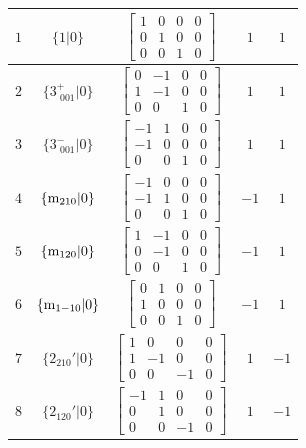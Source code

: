 \documentclass[fleqn,8pt]{jsarticle}
\begin{document}
\begin{longtable}{ccccc}
$ 1 $ & $ \{1|0\} $ & $ \begin{bmatrix} 1 & 0 & 0 & 0 \\ 0 & 1 & 0 & 0 \\ 0 & 0 & 1 & 0 \end{bmatrix} $ & $ 1 $ & $ 1 $ \\ \hline
$ 2 $ & $ \{3^{+}_{\,\,001}|0\} $ & $ \begin{bmatrix} 0 & -1 & 0 & 0 \\ 1 & -1 & 0 & 0 \\ 0 & 0 & 1 & 0 \end{bmatrix} $ & $ 1 $ & $ 1 $ \\ \hline
$ 3 $ & $ \{3^{-}_{\,\,001}|0\} $ & $ \begin{bmatrix} -1 & 1 & 0 & 0 \\ -1 & 0 & 0 & 0 \\ 0 & 0 & 1 & 0 \end{bmatrix} $ & $ 1 $ & $ 1 $ \\ \hline
$ 4 $ & $ \{{\rm m}_{210}|0\} $ & $ \begin{bmatrix} -1 & 0 & 0 & 0 \\ -1 & 1 & 0 & 0 \\ 0 & 0 & 1 & 0 \end{bmatrix} $ & $ -1 $ & $ 1 $ \\ \hline
$ 5 $ & $ \{{\rm m}_{120}|0\} $ & $ \begin{bmatrix} 1 & -1 & 0 & 0 \\ 0 & -1 & 0 & 0 \\ 0 & 0 & 1 & 0 \end{bmatrix} $ & $ -1 $ & $ 1 $ \\ \hline
$ 6 $ & $ \{{\rm m}_{1-10}|0\} $ & $ \begin{bmatrix} 0 & 1 & 0 & 0 \\ 1 & 0 & 0 & 0 \\ 0 & 0 & 1 & 0 \end{bmatrix} $ & $ -1 $ & $ 1 $ \\ \hline
$ 7 $ & $ \{2{}_{210}{}'|0\} $ & $ \begin{bmatrix} 1 & 0 & 0 & 0 \\ 1 & -1 & 0 & 0 \\ 0 & 0 & -1 & 0 \end{bmatrix} $ & $ 1 $ & $ -1 $ \\ \hline
$ 8 $ & $ \{2{}_{120}{}'|0\} $ & $ \begin{bmatrix} -1 & 1 & 0 & 0 \\ 0 & 1 & 0 & 0 \\ 0 & 0 & -1 & 0 \end{bmatrix} $ & $ 1 $ & $ -1 $ \\ \hline

\end{longtable}
\end{document}
